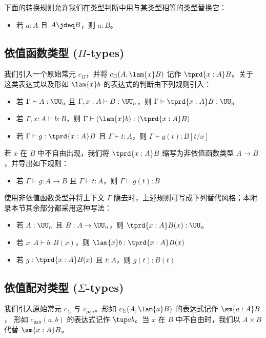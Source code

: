 下面的转换规则允许我们在类型判断中用与某类型相等的类型替换它：
%
\begin{itemize}
\item 若 $a:A$ 且 $A \jdeq B$，则 $a:B$。
\end{itemize}

\subsection{依值函数类型 (\texorpdfstring{$\Pi$}{Π}-types)}

我们引入一个原始常元 $c_\Pi$，并将
$c_\Pi(A,\lam{x} B)$ 记作 $\tprd{x:A}B$。关于
这类表达式以及形如 $\lam{x} b$ 的表达式的判断由下列规则引入：
%
\begin{itemize}
\item 若 $\Gamma \vdash A:\UU_n$ 且 $\Gamma,x:A \vdash B:\UU_n$，则 $\Gamma \vdash \tprd{x:A}B : \UU_n$
\item 若 $\Gamma, x:A \vdash b:B$，则 $\Gamma \vdash (\lam{x} b) : (\tprd{x:A} B)$
\item 若 $\Gamma\vdash g:\tprd{x:A} B$ 且 $\Gamma\vdash t:A$，则 $\Gamma\vdash g(t):B[t/x]$
\end{itemize}
%
若 $x$ 在 $B$ 中不自由出现，我们将 $\tprd{x:A} B$ 缩写为非依值函数类型
$A\rightarrow B$，并导出如下规则：
%
\begin{itemize}
\item 若 $\Gamma\vdash g:A \rightarrow B$ 且 $\Gamma\vdash t:A$，则 $\Gamma\vdash g(t):B$
\end{itemize}
使用非依值函数类型并将上下文 $\Gamma$ 隐去时，上述规则可写成下列替代风格；本附录本节其余部分都采用这种写法：
%
\begin{itemize}
\item 若 $A:\UU_n$ 且 $B:A\to\UU_n$，则 $\tprd{x:A}B(x) : \UU_n$
\item 若 $x:A \vdash b:B(x)$，则 $ \lam{x} b : \tprd{x:A} B(x)$
\item 若 $g:\tprd{x:A} B(x)$ 且 $t:A$，则 $g(t):B(t)$
\end{itemize}
%

\subsection{依值配对类型 (\texorpdfstring{$\Sigma$}{Σ}-types)}

我们引入原始常元 $c_\Sigma$ 与 $c_{\mathsf{pair}}$。形如
$c_\Sigma(A,\lam{a} B)$ 的表达式记作 $\sm{a:A}B$，
形如 $c_{\mathsf{pair}}(a,b)$ 的表达式记作 $\tup
a b$。当 $x$ 在 $B$ 中不自由时，我们以 $A\times B$ 代替 $\sm{x:A} B$。

